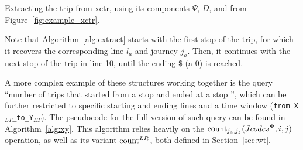 	\begin{algorithm}[h!]
     
     
     \caption{Extracting the trip  from \acrshort{xctr}, using its components $\Psi$, $D$,  and  from Figure~\ref{fig:example_xctr}.}
     \label{alg:extract}
    \end{algorithm}
    
    Note that Algorithm~\ref{alg:extract} starts with the first stop of the trip, for which it recovers the corresponding line $l_a$ and journey $j_a$. Then, it continues with the next stop of the trip in line 10, until the ending $\$$ (a 0) is reached.
    
    A more complex example of these structures working together is the query ``number of trips that started from a stop  and ended at a stop '', which can be further restricted to specific starting and ending lines and a time window (\texttt{from\_X$_{LT}$\_to\_Y$_{LT}$}). The pseudocode for the full version of such query can be found in Algorithm~\ref{alg:xy}. This algorithm relies heavily on the $\operatorname{count}_{j_a,j_z}(Jcodes^{\Psi},i,j)$ operation, as well as its variant $\operatorname{count}^{LR}$, both defined in Section~\ref{sec:wt}.
    
